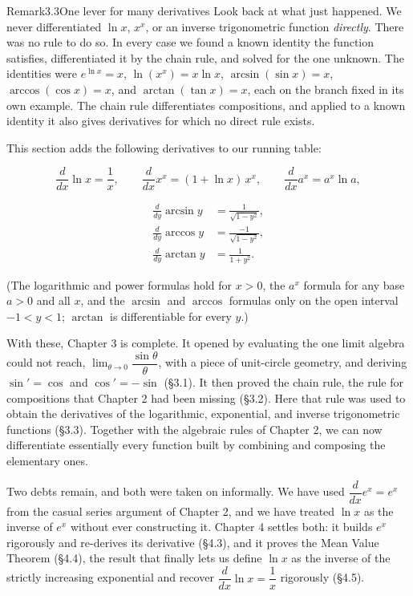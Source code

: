 \documentclass[a4paper,12pt,oneside]{memoir}
\begin{document}
\begin{envremark}{Remark}{3.3}{One lever for many derivatives}
Look back at what just happened. We never differentiated \(\ln x\), \(x^{x}\), or an inverse trigonometric function \emph{directly}. There was no rule to do so. In every case we found a known identity the function satisfies, differentiated it by the chain rule, and solved for the one unknown. The identities were \(e^{\ln x} = x\), \(\ln(x^{x}) = x\ln x\), \(\arcsin(\sin x) = x\), \(\arccos(\cos x) = x\), and \(\arctan(\tan x) = x\), each on the branch fixed in its own example. The chain rule differentiates compositions, and applied to a known identity it also gives derivatives for which no direct rule exists.
\end{envremark}
This section adds the following derivatives to our running table:

\[ \frac{d}{dx}\ln x = \frac{1}{x}, \qquad \frac{d}{dx}x^{x} = (1 + \ln x)\,x^{x}, \qquad \frac{d}{dx}a^{x} = a^{x}\ln a, \]

\[ \begin{aligned}
    \frac{d}{dy}\arcsin y &= \frac{1}{\sqrt{1 - y^{2}}}, \\[2pt]
    \frac{d}{dy}\arccos y &= \frac{-1}{\sqrt{1 - y^{2}}}, \\[2pt]
    \frac{d}{dy}\arctan y &= \frac{1}{1 + y^{2}}.
  \end{aligned} \]

(The logarithmic and power formulas hold for \(x > 0\), the \(a^{x}\) formula for any base \(a > 0\) and all \(x\), and the \(\arcsin\) and \(\arccos\) formulas only on the open interval \(-1 < y < 1\); \(\arctan\) is differentiable for every \(y\).)

With these, Chapter 3 is complete. It opened by evaluating the one limit algebra could not reach, \(\lim_{\theta \to 0}\dfrac{\sin\theta}{\theta}\), with a piece of unit-circle geometry, and deriving \(\sin' = \cos\) and \(\cos' = -\sin\) (§3.1). It then proved the chain rule, the rule for compositions that Chapter 2 had been missing (§3.2). Here that rule was used to obtain the derivatives of the logarithmic, exponential, and inverse trigonometric functions (§3.3). Together with the algebraic rules of Chapter 2, we can now differentiate essentially every function built by combining and composing the elementary ones.

Two debts remain, and both were taken on informally. We have used \(\dfrac{d}{dx}e^{x} = e^{x}\) from the casual series argument of Chapter 2, and we have treated \(\ln x\) as the inverse of \(e^{x}\) without ever constructing it. Chapter 4 settles both: it builds \(e^{x}\) rigorously and re-derives its derivative (§4.3), and it proves the Mean Value Theorem (§4.4), the result that finally lets us define \(\ln x\) as the inverse of the strictly increasing exponential and recover \(\dfrac{d}{dx}\ln x = \dfrac{1}{x}\) rigorously (§4.5).
\end{document}
